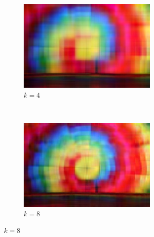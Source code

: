 \documentclass[brazil,times]{abnt}
\begin{document}
\begin{figure}
        \begin{subfigure}[b]{0.5\textwidth}
                \centering
                \includegraphics[width=\textwidth]{imagens/balloon256-compressed-4.jpg}
                \caption{$k = 4$}
        \end{subfigure}%
        ~ %
        \begin{subfigure}[b]{0.5\textwidth}
                \centering
                \includegraphics[width=\textwidth]{imagens/balloon256-compressed-8.jpg}
                \caption{$k = 8$}
        \end{subfigure}
        

\end{figure}
\end{document}
